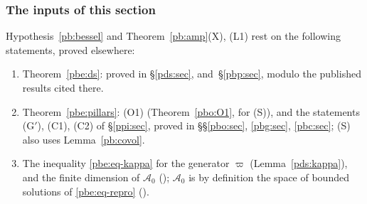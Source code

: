 \documentclass[10pt]{amsart}
\theoremstyle{definition}
\theoremstyle{remark}
\providecommand{\auAz}{\mathcal A_0}
\providecommand{\auDX}{D_X}
\providecommand{\auF}{\mathbb F}
\providecommand{\auG}{\overline G}
\providecommand{\auGL}{\mathrm{GL}}
\providecommand{\auPl}{\Phi}
\providecommand{\auS}{\mathcal S}
\providecommand{\auU}{\mathrm U}
\providecommand{\aubar}[1]{\overline{#1}}
\providecommand{\pbDid}{\mathcal D_{\mathrm{id}}}
\providecommand{\pbDmain}{\mathcal D_{\mathrm{main}}}
\providecommand{\pbR}{\overline R_0}
\begin{document}
\subsubsection{The inputs of this section}\label{pbe:ss-remains}

Hypothesis~\ref{pb:bessel} and Theorem~\ref{pb:amp}\textup{(X)}, \textup{(L1)} rest on the following
statements, proved elsewhere:
\begin{enumerate}
\item[(i)] Theorem~\ref{pbe:ds}: proved in \S\ref{pds:sec}, {\cite[\S3.2]{P49}} and~\S\ref{pbp:sec}, modulo the published results cited there.
\item[(ii)] Theorem~\ref{pbe:pillars}: \textup{(O1)} (Theorem~\ref{pbo:O1}, for \textup{(S)}), and the statements \textup{(G$'$)}, \textup{(C1)}, \textup{(C2)} of \S\ref{ppi:sec}, proved in \S\S\ref{pbo:sec}, \ref{pbg:sec}, \ref{pbc:sec}; \textup{(S)} also uses Lemma~\ref{pb:covol}.
\item[(iii)] The inequality \eqref{pbe:eq-kappa} for the generator $\varpi$ (Lemma~\ref{pds:kappa}), and the
finite dimension of $\auAz$ ({\cite[Proposition~8.4(a)]{P49}}); $\auAz$ is by definition the space of bounded
solutions of \eqref{pbe:eq-repro} ({\cite[\S14.3]{P46}}).
\end{enumerate}



\providecommand{\auO}{\mathcal O}
\providecommand{\auPl}{\Phi}
\providecommand{\auS}{\mathcal S}
\providecommand{\auG}{\overline G}
\providecommand{\auDX}{D_X}
\providecommand{\auNm}{\operatorname{Nm}}
\providecommand{\auU}{\mathrm U}
\providecommand{\auGL}{\mathrm{GL}}
\providecommand{\auA}{\mathbb A}
\providecommand{\auF}{\mathbb F}
\providecommand{\aurd}{\mathrm{rd}_E}
\providecommand{\aubar}[1]{\overline{#1}}
\providecommand{\auf}[1]{\texttt{#1}}
\providecommand{\panot}[1]{\par\smallskip{\raggedright\noindent\textbf{[Not proved here:} #1\textbf{]}\par}\smallskip}
\providecommand{\pbR}{\overline R_0}
\providecommand{\pbUb}{\overline U}
\providecommand{\pbHb}{\overline H}
\providecommand{\pbvol}{\operatorname{vol}}
\providecommand{\pbDid}{\mathcal D_{\mathrm{id}}}
\providecommand{\pbDmain}{\mathcal D_{\mathrm{main}}}
\providecommand{\pbdeg}{\operatorname{deg}}
\providecommand{\pbmass}{\operatorname{mass}}
\providecommand{\pbFix}{\operatorname{Fix}}
\providecommand{\pbg}{\mathsf g}
\providecommand{\pbLM}{\mathrm{LM}}
\providecommand{\pbnat}{\natural}
\providecommand{\pbip}[2]{\langle#1,#2\rangle}
\providecommand{\pbmD}{\mathsf D}
\providecommand{\pbmPhi}{\varphi}
\providecommand{\pbmGf}{G^{\flat}}
\providecommand{\pbmXp}{X^{+}}
\providecommand{\pbmOrb}{\mathcal O}
\providecommand{\pbmKl}{\mathsf{Kl}}
\providecommand{\pbmT}{\mathcal T}
\providecommand{\pbmAT}{\mathbb A_T}
\providecommand{\pbmRT}{R_T}
\providecommand{\pbmE}{\mathsf E}
\providecommand{\pbmn}{\mathsf n}
\providecommand{\pbmden}{\mathsf{den}}
\providecommand{\pbmvol}{\mathsf v}
\providecommand{\pbmdec}{\mathsf d}
\providecommand{\pbmaS}{\mathsf a_*}
\providecommand{\pbmrS}{\mathsf r_*}
\providecommand{\pbmnuS}{\nu_*}
\providecommand{\pbmcG}{c_G}
\providecommand{\pbmTh}{\Theta}
\providecommand{\pbmSt}{\operatorname{Stab}}
\end{document}
